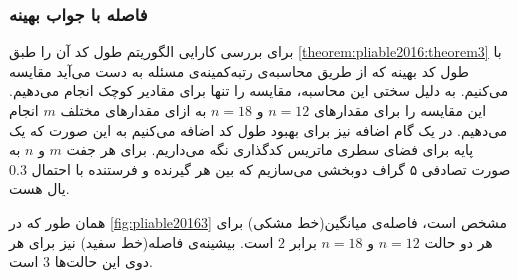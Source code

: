 \subsubsection{
	فاصله با جواب بهینه
}
برای بررسی کارایی الگوریتم
طول کد آن را طبق
\autoref{theorem:pliable2016:theorem3}
با طول کد بهینه که از طریق محاسبه‌ی رتبه‌کمینه‌ی مسئله به دست می‌آید مقایسه می‌کنیم. به دلیل سختی این محاسبه، مقایسه را تنها برای مقادیر کوچک انجام می‌دهیم. این مقایسه را برای مقدارهای
$n = 12$
و
$n = 18$
به ازای مقدارهای مختلف
$m$
انجام می‌دهیم.  در
یک گام اضافه نیز برای بهبود طول کد اضافه می‌کنیم به این صورت که یک پایه برای فضای سطری ماتریس کدگذاری نگه می‌داریم. برای هر جفت
$m$
و
$n$
به صورت تصادفی ۵ گراف دوبخشی می‌سازیم که بین هر گیرنده و فرستنده با احتمال
$0.3$
یال هست.

همان طور که در
\autoref{fig:pliable20163}
	مشخص است، فاصله‌ی میانگین(خط مشکی) برای هر دو حالت
	$n = 12$
	و
	$n = 18$
	برابر
	$2$
	است. بیشینه‌ی فاصله(خط سفید) نیز برای هر دوی این حالت‌ها
	$3$
	است.
	
